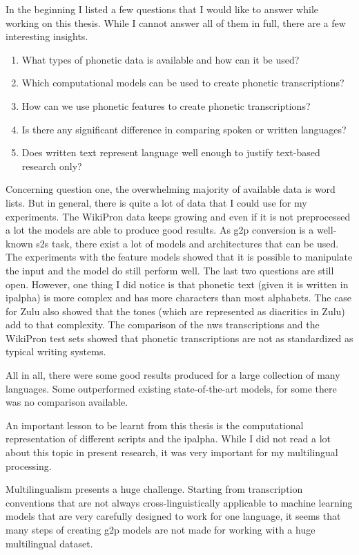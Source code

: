 \label{chap:6_conclusion}
In the beginning I listed a few questions that I would like to answer while working on this thesis. While I cannot answer all of them in full, there are a few interesting insights.

\begin{enumerate}
\item What types of phonetic data is available and how can it be used?
\item Which computational models can be used to create phonetic transcriptions?
\item How can we use phonetic features to create phonetic transcriptions?
\item Is there any significant difference in comparing spoken or written languages?
\item Does written text represent language well enough to justify text-based research only?
\end{enumerate}

Concerning question one, the overwhelming majority of available data is word lists. But in general, there is quite a lot of data that I could use for my experiments. The WikiPron data keeps growing and even if it is not preprocessed a lot the models are able to produce good results. As \ac{g2p} conversion is a well-known \ac{s2s} task, there exist a lot of models and architectures that can be used. The experiments with the feature models showed that it is possible to manipulate the input and the model do still perform well. The last two questions are still open. However, one thing I did notice is that phonetic text (given it is written in \ac{ipalpha}) is more complex and has more characters than most alphabets. The case for Zulu also showed that the tones (which are represented as diacritics in Zulu) add to that complexity. The comparison of the \ac{nws} transcriptions and the WikiPron test sets showed that phonetic transcriptions are not as standardized as typical writing systems. 

All in all, there were some good results produced for a large collection of many languages. Some outperformed existing state-of-the-art models, for some there was no comparison available. 

An important lesson to be learnt from this thesis is the computational representation of different scripts and the \ac{ipalpha}. While I did not read a lot about this topic in present research, it was very important for my multilingual processing.

Multilingualism presents a huge challenge. Starting from transcription conventions that are not always cross-linguistically applicable to machine learning models that are very carefully designed to work for one language, it seems that many steps of creating \ac{g2p} models are not made for working with a huge multilingual dataset.

